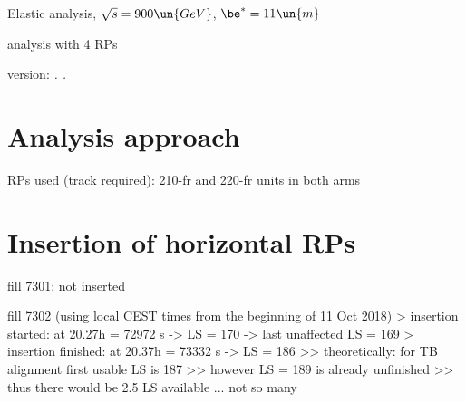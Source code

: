 

\def\baseDir{/afs/cern.ch/work/j/jkaspar/work/analyses/elastic/450GeV/beta11/4rp/}


\hbox{}
\vskip-10mm

\centerline{\SetFontSizesXX Elastic analysis, $\sqrt s = 900\un{GeV}$, $\be^* = 11\un{m}$}
\vskip2mm
\centerline{\SetFontSizesXX analysis with 4 RPs }
\vskip2mm
\centerline{version: {\it \number\day. \number\month. \number\year}}

\vfil
\InsertToc

\vfil
\eject

\BeginText

\chapter{Analysis approach}

\> RPs used (track required): 210-fr and 220-fr units in both arms


\chapter{Insertion of horizontal RPs}

\> fill 7301: not inserted

\> fill 7302 (using local CEST times from the beginning of 11 Oct 2018)
\>> insertion started: at 20.27h = 72972 s -> LS = 170 -> last unaffected LS = 169
\>> insertion finished: at 20.37h = 73332 s -> LS = 186
\>>> theoretically: for TB alignment first usable LS is 187
\>>> however LS = 189 is already unfinished
\>>> thus there would be 2.5 LS available ... not so many




\EndText
\bye
